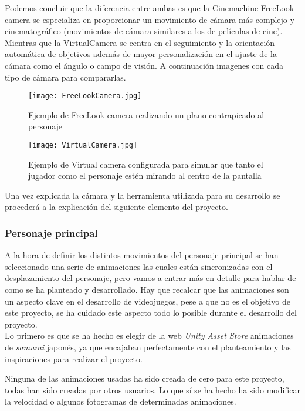Podemos concluir que la diferencia entre ambas es que la Cinemachine FreeLook camera se especializa en proporcionar un movimiento de cámara más complejo y cinematográfico (movimientos de cámara similares a los de películas de cine). Mientras que la VirtualCamera se centra en el seguimiento y la orientación automática de objetivos además de mayor personalización en el ajuste de la cámara como el ángulo o campo de visión. A continuación imagenes con cada tipo de cámara para compararlas.

\begin{figure}[H]
    \centering
    \texttt{[image: FreeLookCamera.jpg]}
    \caption{Ejemplo de FreeLook camera realizando un plano contrapicado al personaje}
\end{figure}

\begin{figure}[H]
    \centering
    \texttt{[image: VirtualCamera.jpg]}
    \caption{Ejemplo de Virtual camera configurada para simular que tanto el jugador como el personaje estén mirando al centro de la pantalla}
\end{figure}
 
Una vez explicada la cámara y la herramienta utilizada para su desarrollo se procederá a la explicación del siguiente elemento del proyecto.

\subsubsection{Personaje principal}

A la hora de definir los distintos movimientos del personaje principal se han seleccionado una serie 
de animaciones las cuales están sincronizadas con el desplazamiento del personaje, pero vamos a entrar más en detalle para hablar de como se 
ha planteado y desarrollado. Hay que recalcar que las animaciones son un aspecto clave en el desarrollo de videojuegos, pese a que no es el objetivo de este proyecto, se ha cuidado este aspecto todo lo posible durante el desarrollo del proyecto.\\

Lo primero es que se ha hecho es elegir de la web \textit{Unity Asset Store} animaciones de \textit{samurai} japonés, ya que encajaban perfectamente con el planteamiento y las inspiraciones para realizar el proyecto.  

Ninguna de las animaciones usadas ha sido creada de cero para este proyecto, todas han sido creadas por otros usuarios. Lo que sí se ha hecho ha sido modificar la velocidad o algunos fotogramas de determinadas animaciones. 

